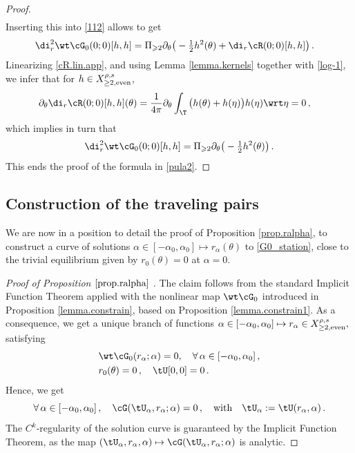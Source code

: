 \documentclass[a4paper,reqno,10pt]{article}
\newcommand{\pa}{\partial}
\begin{document}
\begin{proof}
\begin{align*}
            \end{align*}
            Inserting this into \eqref{112} allows to get
             \begin{align*}
		\di_{r}^2 \wt\cG_{0}(0;0)[h,h]& = \Pi_{\geqslant2}\pa_{\theta}  \big( - \tfrac12 h^2(\theta)+\di_{r}\cR(0;0)[h,h]\big) \,.
	\end{align*}
   Linearizing \eqref{cR.lin.app}, and using  Lemma \ref{lemma.kernels} together with \eqref{log-1}, we infer that  for $h\in X_{\geq 2,\rm even}^{\rho,s}$,
    \begin{align*}
	\partial_\theta\di_{r}\cR(0;0)[h,h](\theta)& = \frac{1}{4\pi} \partial_\theta\int_{\T} \big(h(\theta)+h(\eta)\big) h(\eta) \wrt \eta  =0 \,,
	\end{align*}
which implies in turn that 
$$\di_{r}^2 \wt\cG_{0}(0;0)[h,h] = \Pi_{\geqslant2}\pa_{\theta}  \big(-\tfrac12 h^2(\theta)\big) \,. $$
This ends the proof of the  formula in \eqref{pula2}.
    \end{proof}
\subsection{Construction of the traveling pairs}\label{Sec-proof-TP}
We are now in a position to detail the proof of  Proposition \ref{prop.ralpha}, to construct a curve of solutions $\alpha \in [-\alpha_0, \alpha_0] \mapsto r_{\alpha}(\theta)$ to \eqref{G0_station}, close to the trivial equilibrium given by $r_0(\theta) = 0$ at $\alpha = 0$.
\begin{proof}[Proof of Proposition $\ref{prop.ralpha}$ ]
	The claim follows from the standard Implicit Function Theorem applied with  the nonlinear map $\wt\cG_{0}$ introduced in Proposition \ref{lemma.constrain}, based on Proposition \ref{lemma.constrain1}.  As a consequence, we get a unique branch of functions $\alpha\in[-\alpha_0,\alpha_0]\mapsto r_\alpha\in X_{\geq 2,\rm even}^{\rho,s},$ satisfying
    \begin{equation}\label{IFT.equa}
		\begin{aligned}
			& \wt\cG_{0}(r_{\alpha};\alpha)=0, \quad \forall\,\alpha\in[-\alpha_{0},\alpha_{0}]\,,
	 	\\
 	& r_0(\theta) = 0 \,, \quad \tU[0,0] = 0\,.
		\end{aligned}
	\end{equation}
    Hence, we get
    $$
   \forall \, \alpha\in [-\alpha_0,\alpha_0]\,,\quad \cG(\tU_\alpha,r_\alpha;\alpha)=0 \,,\quad\hbox{with}\quad \tU_\alpha:=\tU(r_{\alpha},\alpha) \,.
   $$
   The $C^k$-regularity  of  the solution curve is guaranteed by the Implicit Function Theorem, as  the map $(\tU_\alpha,r_\alpha,\alpha)\mapsto \cG(\tU_\alpha,r_\alpha;\alpha)$ is analytic.   
\end{proof}
\end{document}
